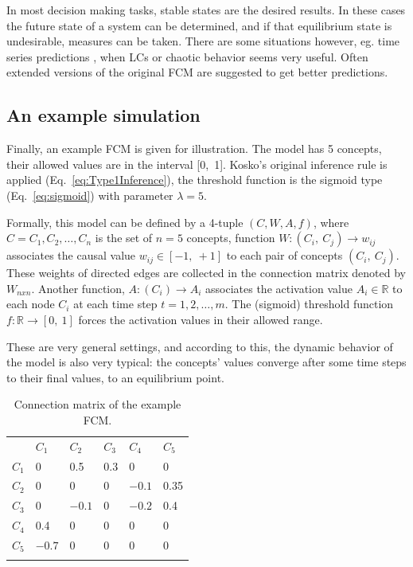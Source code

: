\documentclass[graybox]{svmult}
\begin{document}
In most decision making tasks, stable states are the desired results. In these cases the future state of a system can be determined, and if that equilibrium state is undesirable, measures can be taken. There are some situations however, eg. time series predictions \cite{homenda2014modeling,homenda2017clustering,lu2014modeling}, when LCs or chaotic behavior seems very useful. Often extended versions of the original FCM are suggested to get better predictions.

\subsection{An example simulation}

Finally, an example FCM is given for illustration. The model has 5 concepts, their allowed values are in the interval [0,~1]. Kosko's original inference rule is applied (Eq.~\ref{eq:Type1Inference}), the threshold function is the sigmoid type (Eq.~\ref{eq:sigmoid}) with parameter $\lambda = 5$.

Formally, this model can be defined by a 4-tuple $(C, W, A, f)$, where $C = C_1, C_2,\dots, C_n$ is the set of $n=5$ concepts, function $W : (C_i,~C_j) \to w_{ij}$ associates the causal value $w_{ij} \in [-1,~+1]$ to each pair of concepts $(C_i,~C_j)$. These weights of directed edges are collected in the connection matrix denoted by $W_{nxn}$. Another function, $A : (C_i) \to A_i$ associates the activation value $A_i \in \mathbb{R}$ to each node $C_i$ at each time step $t = 1, 2,\dots, m$. The (sigmoid) threshold function $f : \mathbb{R} \to [0,~1]$ forces the activation values in their allowed range.

These are very general settings, and according to this, the dynamic behavior of the model is also very typical: the concepts' values converge after some time steps to their final values, to an equilibrium point.

\begin{table}[!t]
\caption{Connection matrix of the example FCM.}
\label{tab:exampleConnMtx}
\begin{tabular}{p{1cm}|p{1cm}p{1cm}p{1cm}p{1cm}p{1cm}}
\hline\noalign{\smallskip}
 & $C_1$ & $C_2$ & $C_3$ & $C_4$ & $C_5$ \\
\noalign{\smallskip}\svhline\noalign{\smallskip}
$C_1$ & 0 & 0.5 & 0.3 & 0 & 0 \\
$C_2$ & 0 & 0 & 0 & $-0.1$ & 0.35 \\
$C_3$ & 0 & $-0.1$ & 0 & $-0.2$ & 0.4 \\
$C_4$ & 0.4 & 0 & 0 & 0 & 0 \\
$C_5$ & $-0.7$ & 0 & 0 & 0 & 0 \\
\noalign{\smallskip}\hline\noalign{\smallskip}
\end{tabular}
\end{table}
\end{document}
